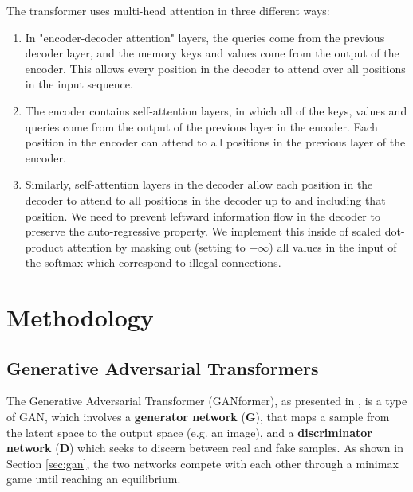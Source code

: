 \documentclass{article}
\begin{document}
	The transformer uses multi-head attention in three different ways:
	\begin{enumerate}
		\item In "encoder-decoder attention" layers, the queries come from the previous decoder layer, 
		and the memory keys and values come from the output of the encoder. This allows every position 
		in the decoder to attend over all positions in the input sequence.
		\item The encoder contains self-attention layers, in which all of the keys, values 
		and queries come from the output of the previous layer in the encoder. 
		Each position in the encoder can attend to all positions in the previous layer of the encoder.
		\item Similarly, self-attention layers in the decoder allow each position in the decoder to attend to 
		all positions in the decoder up to and including that position. We need to prevent leftward 
		information flow in the decoder to preserve the auto-regressive property. We implement this 
		inside of scaled dot-product attention by masking out (setting to $-\infty$) all values in the input 
		of the softmax which correspond to illegal connections. 
	\end{enumerate}

	
	\section{Methodology}
	
	\subsection{Generative Adversarial Transformers}%
	The Generative Adversarial Transformer (GANformer), as presented in \cite{hudson2021generative}, 
	is a type of GAN, which involves a \textbf{generator network} ($\bm{G}$), that maps a sample from 
	the latent space to the output space (e.g. an image), and a \textbf{discriminator network}
	($\bm{D}$) which seeks to discern between real and fake samples. As shown in Section 
	\ref{sec:gan}, the two networks compete with each other through a minimax game until reaching an 
	equilibrium. 
	
\end{document}
